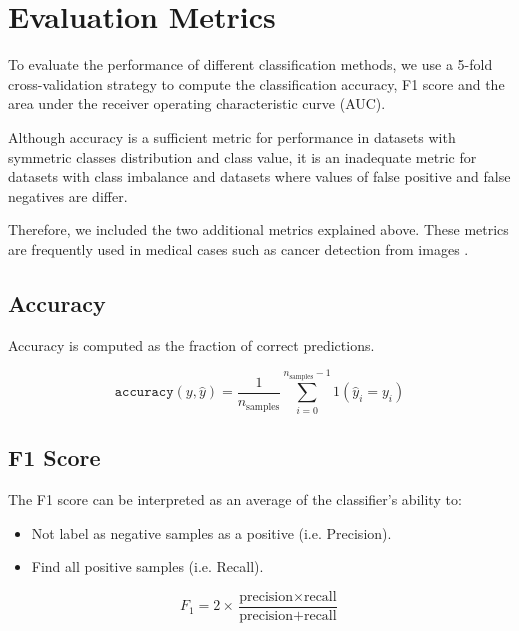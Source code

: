

\section{Evaluation Metrics}

To evaluate the performance of different classification methods, we use a 5-fold cross-validation strategy to compute the classification accuracy, F1 score and the area under the receiver operating characteristic curve (AUC).

Although accuracy is a sufficient metric for performance in datasets with symmetric classes distribution and class value, it is an inadequate metric for datasets with class imbalance and datasets where values of false positive and false negatives are differ.

Therefore, we included the two additional metrics explained above. These metrics are frequently used in medical cases such as cancer detection from images \cite{Sirinukunwattana2016LocalityImages}\cite{Ciresan2013MitosisNetworks}.

\subsection{Accuracy}
Accuracy is computed as the fraction of correct predictions.

\[ \texttt{accuracy}(y, \hat{y}) = \frac{1}{n_\text{samples}} \sum_{i=0}^{n_\text{samples}-1} 1(\hat{y}_i = y_i) \]

\subsection{F1 Score}
The F1 score can be interpreted as an average of the classifier’s ability to:
\begin{itemize}
	\item Not label as negative samples as a positive (i.e. Precision).
	\item Find all positive samples (i.e. Recall).
\end{itemize}

\[ F_1 = 2 \times \frac{\text{precision} \times \text{recall}}{\text{precision} + \text{recall}} \]

